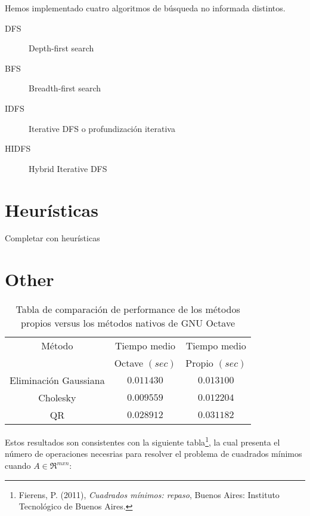 \documentclass[%
	final,
	reprint,
	notitlepage,
	narroweqnarray,
	inline,
	twoside,
	invited
	]{ieee}
\begin{document}
\par Hemos implementado cuatro algoritmos de búsqueda no informada distintos.

\begin{description}

\item[DFS]
Depth-first search

\item[BFS]
Breadth-first search

\item[IDFS]
Iterative DFS o profundización iterativa

\item[HIDFS]
Hybrid Iterative DFS

\end{description}

\section{Heurísticas}

\par Completar con heurísticas


\section{Other}

\begin{table}[H]
\begin{center}
\begin{tabular}{|c|c|c|}
\hline
Método & Tiempo medio & Tiempo  medio \\
 &  Octave $(sec)$ & Propio $(sec)$ \\
\hline
\hline
Eliminación Gaussiana & $0.011430$ & $0.013100$ \\
Cholesky & $0.009559$ & $0.012204$ \\
 QR &  $0.028912$&$0.031182$ \\
\hline  
\end{tabular}
\end{center}
\caption{Tabla de comparación de performance de los métodos propios versus los métodos nativos de GNU Octave}
\label{tmedio}
\end{table}

Estos resultados son consistentes con la siguiente tabla\footnote{Fierens, P. (2011), \emph{Cuadrados mínimos: repaso}, Buenos Aires: Instituto Tecnológico de Buenos Aires.}, la cual presenta el número de operaciones necesrias para resolver el problema de cuadrados mínimos cuando $A \in \Re ^{mxn}$:
\end{document}
